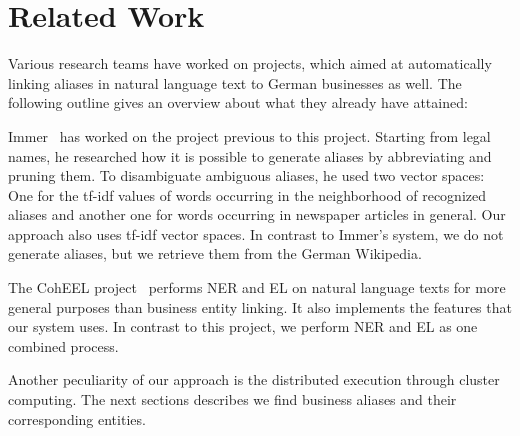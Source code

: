 \section{Related Work}
\label{sec:related_work}
Various research teams have worked on projects, which aimed at automatically linking aliases in natural language text to German businesses as well. The following outline gives an overview about what they already have attained:

Immer~\cite{immer} has worked on the project previous to this project. Starting from legal names, he researched how it is possible to generate aliases by abbreviating and pruning them. To disambiguate ambiguous aliases, he used two vector spaces: One for the tf-idf values of words occurring in the neighborhood of recognized aliases and another one for words occurring in newspaper articles in general. Our approach also uses tf-idf vector spaces. In contrast to Immer's system, we do not generate aliases, but we retrieve them from the German Wikipedia.

The CohEEL project~\cite{coheel} performs NER and EL on natural language texts for more general purposes than business entity linking. It also implements the features that our system uses. In contrast to this project, we perform NER and EL as one combined process.

Another peculiarity of our approach is the distributed execution through cluster computing. The next sections describes we find business aliases and their corresponding entities.

